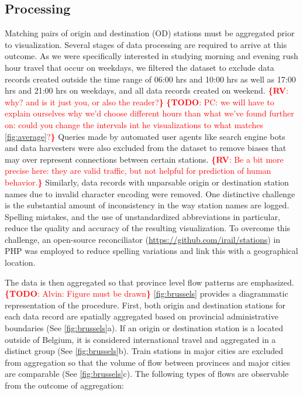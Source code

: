 \documentclass{sig-alternate}
\newcommand{\todo}[1]{\noindent\textcolor{red}{{\bf \{TODO}: #1{\bf \}}}}
\newcommand{\rv}[1]{\noindent\textcolor{red}{{\bf \{RV}: #1{\bf \}}}}
\begin{document}
\subsection{Processing}

Matching pairs of origin and destination (OD) stations must be aggregated prior to visualization.
Several stages of data processing are required to arrive at this outcome.
As we were specifically interested in studying morning and evening rush hour travel that occur on weekdays, we filtered the dataset to exclude data records created outside the time range of 06:00 hrs and 10:00 hrs as well as 17:00 hrs and 21:00 hrs on weekdays, and all data records created on weekend.
\rv{why? and is it just you, or also the reader?}
\todo{PC: we will have to explain ourselves why we'd choose different hours than what we've found further on: could you change the intervals int he visualizations to what matches \cref{fig:average}?} 
Queries made by automated user agents like search engine bots and data harvesters were also excluded from the dataset to remove biases that may over represent connections between certain stations. 
\rv{Be a bit more precise here: they are valid traffic, but not helpful for prediction of human behavior.}
Similarly, data records with unparsable origin or destination station names due to invalid character encoding were removed. 
One distinctive challenge is the substantial amount of inconsistency in the way station names are logged. 
Spelling mistakes, and the use of unstandardized abbreviations in particular, reduce the quality and accuracy of the resulting visualization.
To overcome this challenge, an open-source reconciliator (\url{https://github.com/irail/stations}) in PHP was employed to reduce spelling variations and link this with a geographical location. 

The data is then aggregated so that province level flow patterns are emphasized.
\todo{Alvin: Figure must be drawn}
\cref{fig:brussels} provides a diagrammatic representation of the procedure.
First, both origin and destination stations for each data record are spatially aggregated based on provincial administrative boundaries (See \cref{fig:brussels}a).
If an origin or destination station is a located outside of Belgium, it is considered international travel and aggregated in a distinct group (See \cref{fig:brussels}b).
Train stations in major cities are excluded from aggregation so that the volume of flow between provinces and major cities are comparable (See \cref{fig:brussels}c).
The following types of flows are observable from the outcome of aggregation:
\end{document}
